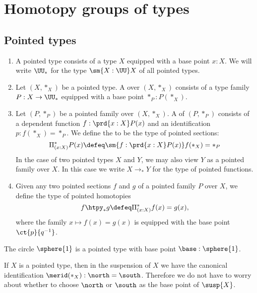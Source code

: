 \chapter{Homotopy groups of types}

\section{Pointed types}

\begin{defn}
\begin{enumerate}
\item A pointed type consists of a type $X$ equipped with a base point $x:X$. We will write $\UU_\ast$ for the type $\sm{X:\UU}X$ of all pointed types.
\item Let $(X,\ast_X)$ be a pointed type. A  over $(X,\ast_X)$ consists of a type family $P:X\to \UU_\ast$ equipped with a base point $\ast_P:P(\ast_X)$. 
\item Let $(P,\ast_P)$ be a pointed family over $(X,\ast_X)$. A  of $(P,\ast_P)$ consists of a dependent function $f:\prd{x:X}P(x)$ and an identification $p:f(\ast_X)=\ast_P$. We define the  to be the type of pointed sections:
\begin{equation*}
\Pi^\ast_{(x:X)}P(x) \defeq \sm{f:\prd{x:X}P(x)}f(\ast_X)=\ast_P
\end{equation*}
In the case of two pointed types $X$ and $Y$, we may also view $Y$ as a pointed family over $X$. In this case we write $X\to_\ast Y$ for the type of pointed functions.
\item Given any two pointed sections $f$ and $g$ of a pointed family $P$ over $X$, we define the type of pointed homotopies
\begin{equation*}
f\htpy_\ast g \defeq \Pi^\ast_{(x:X)} f(x)=g(x),
\end{equation*}
where the family $x\mapsto f(x)=g(x)$ is equipped with the base point $\ct{p}{q^{-1}}$. 
\end{enumerate}
\end{defn}

\begin{eg}
The circle $\sphere{1}$ is a pointed type with base point $\base:\sphere{1}$.
\end{eg}

\begin{eg}
If $X$ is a pointed type, then in the suspension of $X$ we have the canonical identification $\merid(\ast_X):\north=\south$. Therefore we do not have to worry about whether to choose $\north$ or $\south$ as the base point of $\susp{X}$. 
\end{eg} 

